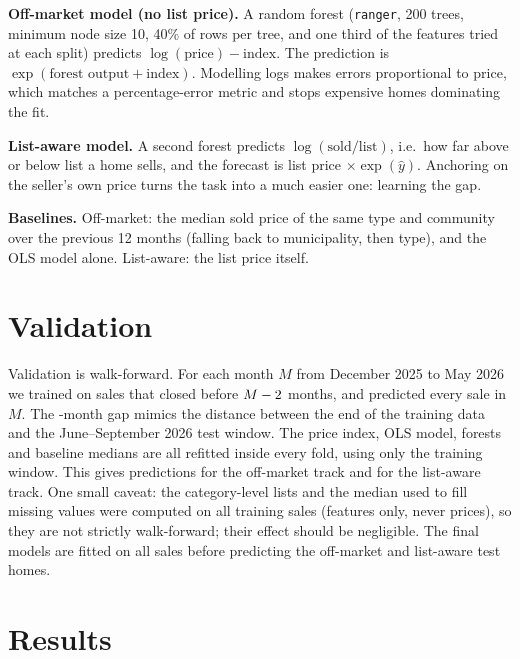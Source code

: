 \documentclass[11pt]{article}
\begin{document}
\textbf{Off-market model (no list price).} A random forest (\texttt{ranger}, 200 trees, minimum node size 10, 40\% of rows per tree, and one third of the features tried at each split) predicts $\log(\text{price}) - \text{index}$. The prediction is $\exp(\text{forest output} + \text{index})$. Modelling logs makes errors proportional to price, which matches a percentage-error metric and stops expensive homes dominating the fit.

\textbf{List-aware model.} A second forest predicts $\log(\text{sold}/\text{list})$, i.e.\ how far above or below list a home sells, and the forecast is list price $\times\exp(\hat y)$. Anchoring on the seller's own price turns the task into a much easier one: learning the gap.

\textbf{Baselines.} Off-market: the median sold price of the same type and community over the previous 12 months (falling back to municipality, then type), and the OLS model alone. List-aware: the list price itself.

\section{Validation}
Validation is walk-forward. For each month $M$ from December 2025 to May 2026 we trained on sales that closed before $M-2$ months, and predicted every sale in $M$. The \gapMonths-month gap mimics the distance between the end of the training data and the June--September 2026 test window. The price index, OLS model, forests and baseline medians are all refitted inside every fold, using only the training window. This gives \nValOff{} predictions for the off-market track and \nValLa{} for the list-aware track. One small caveat: the category-level lists and the median used to fill missing values were computed on all training sales (features only, never prices), so they are not strictly walk-forward; their effect should be negligible. The final models are fitted on all sales before predicting the \nTestOff{} off-market and \nTestLa{} list-aware test homes.

\section{Results}
\begin{table}[h]
\centering

\caption{Walk-forward validation. MdAPE: median absolute percentage error. MAPE: mean absolute percentage error. Brackets: bootstrap 95\% interval (1000 resamples of homes).}
\end{table}
\end{document}
